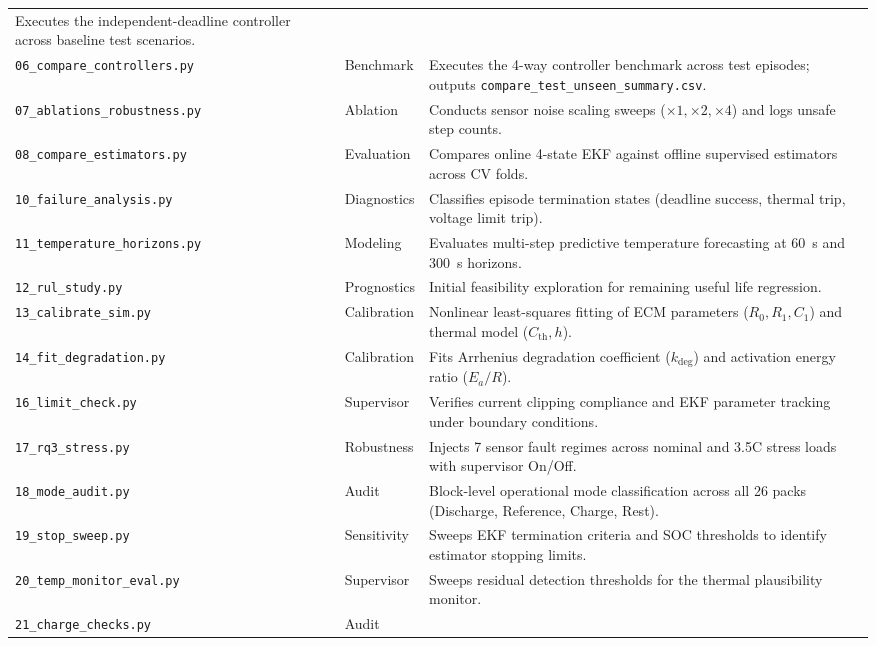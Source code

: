 \begin{center}
\begin{longtable}{>{\raggedright\footnotesize}p{4.4cm} >{\centering\arraybackslash}p{2.0cm} >{\raggedright\arraybackslash}p{7.4cm}}
  Executes the independent-deadline controller across baseline test scenarios. \\
  \texttt{06\_compare\_controllers.py} & Benchmark &
  Executes the 4-way controller benchmark across test episodes; outputs \texttt{compare\_test\_unseen\_summary.csv}. \\
  \texttt{07\_ablations\_robustness.py} & Ablation &
  Conducts sensor noise scaling sweeps ($\times 1, \times 2, \times 4$) and logs unsafe step counts. \\
  \texttt{08\_compare\_estimators.py} & Evaluation &
  Compares online 4-state EKF against offline supervised estimators across CV folds. \\
  \texttt{10\_failure\_analysis.py} & Diagnostics &
  Classifies episode termination states (deadline success, thermal trip, voltage limit trip). \\
  \texttt{11\_temperature\_horizons.py} & Modeling &
  Evaluates multi-step predictive temperature forecasting at \SI{60}{s} and \SI{300}{s} horizons. \\
  \texttt{12\_rul\_study.py} & Prognostics &
  Initial feasibility exploration for remaining useful life regression. \\
  \texttt{13\_calibrate\_sim.py} & Calibration &
  Nonlinear least-squares fitting of ECM parameters ($R_0, R_1, C_1$) and thermal model ($C_{\mathrm{th}}, h$). \\
  \texttt{14\_fit\_degradation.py} & Calibration &
  Fits Arrhenius degradation coefficient ($k_{\mathrm{deg}}$) and activation energy ratio ($E_a/R$). \\
  \texttt{16\_limit\_check.py} & Supervisor &
  Verifies current clipping compliance and EKF parameter tracking under boundary conditions. \\
  \texttt{17\_rq3\_stress.py} & Robustness &
  Injects 7 sensor fault regimes across nominal and 3.5C stress loads with supervisor On/Off. \\
  \texttt{18\_mode\_audit.py} & Audit &
  Block-level operational mode classification across all 26 packs (Discharge, Reference, Charge, Rest). \\
  \texttt{19\_stop\_sweep.py} & Sensitivity &
  Sweeps EKF termination criteria and SOC thresholds to identify estimator stopping limits. \\
  \texttt{20\_temp\_monitor\_eval.py} & Supervisor &
  Sweeps residual detection thresholds for the thermal plausibility monitor. \\
  \texttt{21\_charge\_checks.py} & Audit &

\end{longtable}
\end{center}
